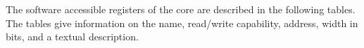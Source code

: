The software accessible registers of the core are described in the following
tables. The tables give information on the name, read/write capability, address, width in bits, and a textual description.



